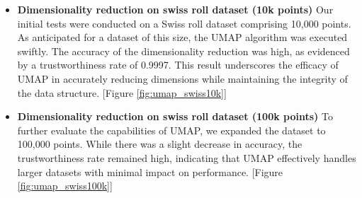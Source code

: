 \begin{itemize}
\begin{itemize}
            \item \textbf{Dimensionality reduction on swiss roll dataset (10k points)}
        Our initial tests were conducted on a Swiss roll dataset comprising 10,000 points. As anticipated for a dataset of this size, the UMAP algorithm was executed swiftly. The accuracy of the dimensionality reduction was high, as evidenced by a trustworthiness rate of 0.9997. This result underscores the efficacy of UMAP in accurately reducing dimensions while maintaining the integrity of the data structure. [Figure \ref{fig:umap_swiss10k}]
        
         \item \textbf{Dimensionality reduction on swiss roll dataset (100k points)}
        To further evaluate the capabilities of UMAP, we expanded the dataset to 100,000 points. While there was a slight decrease in accuracy, the trustworthiness rate remained high, indicating that UMAP effectively handles larger datasets with minimal impact on performance. [Figure \ref{fig:umap_swiss100k}]


\end{itemize}
\end{itemize}

